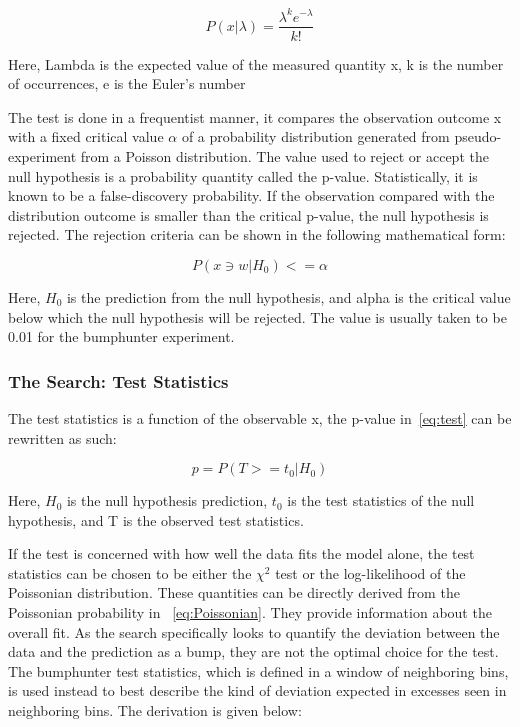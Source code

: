 \begin{equation}
 P(x|\lambda) = \frac{\lambda^{k}e^{-\lambda}}{k!} 
 \label{eq:Poissonian}
\end{equation}

Here, Lambda is the expected value of the measured quantity x, k is the number of occurrences, e is the Euler's number  

    The test is done in a frequentist manner, it compares the observation outcome x with a fixed critical value $\alpha$ of a probability distribution generated from pseudo-experiment from a Poisson distribution. The value used to reject or accept the null hypothesis is a probability quantity called the p-value. Statistically, it is known to be a false-discovery probability. 
    If the observation compared with the distribution outcome is smaller than the critical p-value, the null hypothesis is rejected. The rejection criteria can be shown in the following mathematical form:

\begin{equation}
    P(x \ni w|H_0)<= \alpha 
    \label{eq:test}
\end{equation}


Here, $H_0$ is the prediction from the null hypothesis, and alpha is the critical value below which the null hypothesis will be rejected. The value is usually taken to be 0.01 for the bumphunter experiment. 

\subsubsection{The Search: Test Statistics}
\label{teststatistics}

The test statistics is a function of the observable x, the p-value in~\ref{eq:test} can be rewritten as such:
    
\begin{equation}
    p = P(T>=t_{0}| H_{0})
\label{eq:pvaluetestStats}
\end{equation}

Here, $H_0$ is the null hypothesis prediction, $t_0$ is the test statistics of the null hypothesis, and T is the observed test statistics.


If the test is concerned with how well the data fits the model alone, the test statistics can be chosen to be either the $\chi^{2}$ test or the log-likelihood of the Poissonian distribution. These quantities can be directly derived from the Poissonian probability in ~\ref{eq:Poissonian}. They provide information about the overall fit. As the search specifically looks to quantify the deviation between the data and the prediction as a bump, they are not the optimal choice for the test. 
The bumphunter test statistics, which is defined in a window of neighboring bins, is used instead to best describe the kind of deviation expected in excesses seen in neighboring bins. The derivation is given below: 

